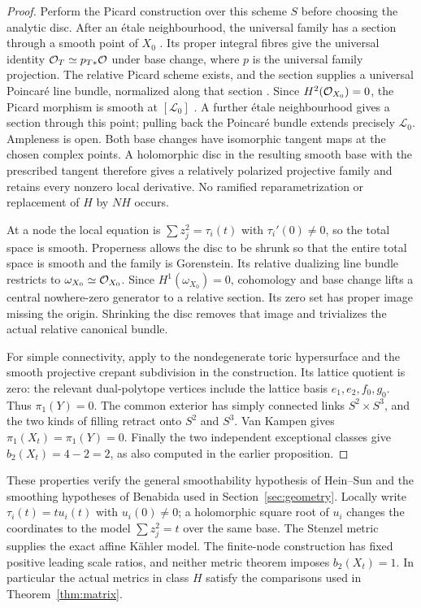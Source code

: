 \begin{proof}
Perform the Picard construction over this scheme $S$ before choosing
the analytic disc. After an \'etale neighbourhood, the universal family
has a section through a smooth point of $X_0$
\cite[Tag~055S]{stacks}. Its proper integral fibres give the universal
identity $\mathcal O_T\simeq p_{T*}\mathcal O$ under base change, where $p$ is the universal family projection.
The relative Picard scheme exists, and the section supplies a universal
Poincar\'e line bundle, normalized along that section
\cite[Theorems~2.5(2), 4.8; Exercises~3.11, 4.3 and their Appendix~A
solutions]{kleiman-picard}. Since $H^2(\mathcal O_{X_0})=0$, the Picard
morphism is smooth at $[\mathcal L_0]$
\cite[Proposition~5.19]{kleiman-picard}. A further \'etale
neighbourhood gives a section through this point; pulling back the
Poincar\'e bundle extends precisely $\mathcal L_0$.
Ampleness is open. Both base changes have isomorphic tangent maps at
the chosen complex points. A holomorphic disc in the resulting smooth
base with the prescribed tangent therefore gives a relatively polarized
projective family and retains every nonzero local derivative. No
ramified reparametrization or replacement of $H$ by $NH$ occurs.

At a node the local equation is
$\sum z_j^2=\tau_i(t)$ with $\tau_i'(0)\ne0$, so the total
space is smooth. Properness allows the disc to be shrunk so that
the entire total space is smooth and the family is Gorenstein.
Its relative dualizing line bundle restricts to
$\omega_{X_0}\simeq\mathcal O_{X_0}$. Since
$H^1(\omega_{X_0})=0$, cohomology and base change lifts a central
nowhere-zero generator to a relative section. Its zero set has proper
image missing the origin. Shrinking the disc removes that image and
trivializes the actual relative canonical bundle.

For simple connectivity, apply
\cite[Corollary~1.9]{batyrev-kreuzer} to the nondegenerate toric
hypersurface and the smooth projective crepant subdivision in the
construction. Its lattice quotient is zero: the relevant dual-polytope
vertices include the lattice basis $e_1,e_2,f_0,g_0$.
Thus $\pi_1(Y)=0$. The common exterior has simply connected links
$S^2\times S^3$, and the two kinds of filling retract onto $S^2$
and $S^3$. Van Kampen gives $\pi_1(X_t)=\pi_1(Y)=0$.
Finally the two independent exceptional classes give
$b_2(X_t)=4-2=2$, as also computed in the earlier proposition.
\end{proof}

These properties verify the general smoothability hypothesis of
Hein--Sun and the smoothing hypotheses of Benabida used in
Section~\ref{sec:geometry}. Locally write $\tau_i(t)=t u_i(t)$
with $u_i(0)\ne0$; a holomorphic square root of $u_i$ changes the
coordinates to the model $\sum z_j^2=t$ over the same base.
The Stenzel metric supplies the exact affine K\"ahler model. The
finite-node construction has fixed positive leading scale ratios,
and neither metric theorem imposes $b_2(X_t)=1$.
In particular the actual metrics in class $H$ satisfy the comparisons
used in Theorem~\ref{thm:matrix}.

